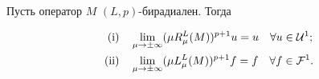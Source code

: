 \begin{lems}


Пусть оператор $M$\;  $(L,p)$-бирадиален. Тогда


\begin{align*}


\mathrm{(i)} &\quad \lim_{\mu\to\pm\infty }


(\mu R^L_{\mu } (M)) ^{p+1}u=u \quad


\forall u \in {\cal U}^1;\\


\mathrm{(ii)}&\quad \lim_{\mu\to\pm\infty }(\mu L^L_\mu (M)) ^{p+1}f=f \quad


\forall f \in {\cal F}^1.


\end{align*}


\end{lems}





